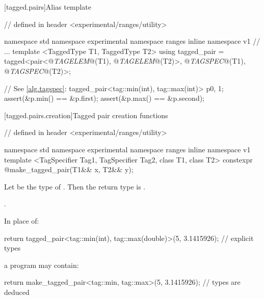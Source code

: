 [tagged.pairs]{Alias template }

\begin{codeblock}
// defined in header <experimental/ranges/utility>

namespace std { namespace experimental { namespace ranges { inline namespace v1 {
  // ...
  template <TaggedType T1, TaggedType T2>
  using tagged_pair = tagged<pair<@\textit{TAGELEM}@(T1), @\textit{TAGELEM}@(T2)>,
                             @\textit{TAGSPEC}@(T1), @\textit{TAGSPEC}@(T2)>;
}}}}
\end{codeblock}

\pnum \enterexample
\begin{codeblock}
// See \ref{alg.tagspec}:
tagged_pair<tag::min(int), tag::max(int)> p{0, 1};
assert(&p.min() == &p.first);
assert(&p.max() == &p.second);
\end{codeblock}
\exitexample

[tagged.pairs.creation]{Tagged pair creation functions}

%
\begin{itemdecl}
// defined in header <experimental/ranges/utility>

namespace std { namespace experimental { namespace ranges { inline namespace v1 {
  template <TagSpecifier Tag1, TagSpecifier Tag2, class T1, class T2>
    constexpr @\seebelow@ make_tagged_pair(T1&& x, T2&& y);
}}}}
\end{itemdecl}

\begin{itemdescr}
\pnum
Let  be the type of .
Then the return type is .

\pnum
\returns {}.

\pnum
\enterexample
In place of:

\begin{codeblock}
  return tagged_pair<tag::min(int), tag::max(double)>(5, 3.1415926);   // explicit types
\end{codeblock}

a \Cpp program may contain:

\begin{codeblock}
  return make_tagged_pair<tag::min, tag::max>(5, 3.1415926);           // types are deduced
\end{codeblock}
\exitexample
\end{itemdescr}

